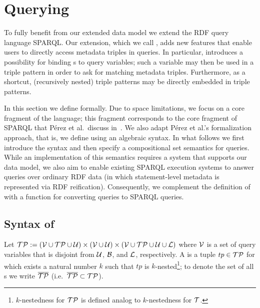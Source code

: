 \section{Querying} \label{Section:Querying}

To fully benefit from our extended data model we extend the RDF query language SPARQL. Our extension, which we call \emph{\SPARQLplus}, adds new features that enable users to directly access metadata triples in queries. In particular, {\SPARQLplus} introduces a possibility for binding {\RDFplusTriple}s to query variables; such a variable may then be used in a triple pattern in order to ask for matching metadata triples. Furthermore, as a shortcut, (recursively nested) triple patterns may be directly embedded in triple patterns.

In this section we define {\SPARQLplus} formally. Due to space limitations, we focus on a core fragment of the language; this fragment corresponds to the core fragment of SPARQL that P\'{e}rez et al.~discuss in~\cite{Perez09:SemanticsAndComplexityOfSPARQL}. We also adapt P\'{e}rez et al.'s formalization approach, that is, we define {\SPARQLplus} using an algebraic syntax. In what follows we first introduce the syntax and then specify a compositional set semantics for {\SPARQLplus} queries. While an implementation of this semantics requires a system that supports our {\RDFplus} data model, we also aim to enable existing SPARQL execution systems to answer
{\SPARQLplus} queries over ordinary RDF data (in which statement-level metadata is represented via RDF reification). Consequently, we complement the definition of {\SPARQLplus}
with a function for converting {\SPARQLplus} queries to SPARQL queries. %


\subsection{Syntax of {\SPARQLplus}}

	Let $\mathcal{TP} := (\mathcal{V} \cup \mathcal{TP} \cup \mathcal{U}) \times (\mathcal{V} \cup \mathcal{U}) \times (\mathcal{V} \cup \mathcal{TP} \cup \mathcal{U} \cup \mathcal{L})$ where $\mathcal{V}$ is a set of query variables that is disjoint from $\mathcal{U}$, $\mathcal{B}$, and $\mathcal{L}$, respectively.
A \emph{\TPplus} is a tuple $tp \in \mathcal{TP}$ for which exists a natural number $k$ such that $tp$ is $k$-nested\footnote{$k$-nestedness for $\mathcal{TP}$ is defined analog to $k$-nestedness for $\mathcal{T}$.}; to denote the set of all {\TPplus}s we write $\overline{\mathcal{TP}}$ (i.e.~$\overline{\mathcal{TP}} \subset \mathcal{TP}$).


